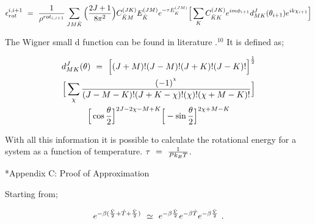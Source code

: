 \documentclass[11pt]{article}
\makeatletter
\let\workreportsection\section
\renewcommand{\section}{\@ifstar{\workreportstarsection}{\workreportsection}}
\newcommand{\workreportstarsection}[1]{\workreportsection*{#1}\addcontentsline{toc}{section}{#1}}
\makeatother
\begin{document}
\begin{equation}
\epsilon_{rot}^{i, i+1} \hspace{0.125cm} = \hspace{0.125cm}  \frac{1}{\rho^{rot_{i, i+1}}} \sum_{J M \hat{K}} \Big( \frac{2 J + 1}{8 \pi^2} \Big) C_{\hat{K} M}^{(JK)} E_{\hat{K}}^{(JM)} e^{- \tau E_{\hat{K}}^{(JM)}} \Big[ \sum_{K} C_{\hat{K} K}^{(JK)} e^{i m \phi_{i+1}} d_{MK}^{J} (\theta_{i+1} )  e^{i k \chi_{i+1}} \Big]
\end{equation}

The Wigner small d function can be found in literature \begin{math}.^{10} \end{math} It is defined as;

\begin{multline*}
d_{MK}^{J} ( \theta ) \hspace{0.125cm} = \hspace{0.125cm}  \Big[ (J + M)! (J - M)! (J + K)! (J - K)! \Big]^{\frac{1}{2}} \\ \Big[ \sum_{\chi} \frac{(-1)^{^{\chi}}}{(J - M - K)!(J + K - \chi)! (\chi)! (\chi + M - K)!} \Big] \\ \Big[ \cos{ \frac{\theta}{2}} \Big]^{2J - 2 \chi - M + K} \Big[ - \sin{ \frac{\theta}{2}} \Big]^{2\chi + M - K}
\end{multline*}

With all this information it is possible to calculate the rotational energy for a system as a function of temperature. \begin{math} \tau \hspace{0.125cm} = \hspace{0.125cm} \frac{1}{P k_B T} \end{math}.

\hypertarget{wr-appendix-c}{}
\section*{Appendix C: Proof of Approximation}
\label{wr-app-thrdappx-1}

Starting from;

\begin{equation} 
e^{-\beta ( \frac{\hat{V}}{2} + \hat{T} + \frac{\hat{V}}{2} )} \hspace{0.125cm} \simeq \hspace{0.125cm} e^{-\beta \frac{\hat{V}}{2}} e^{-\beta \hat{T}} e^{-\beta \frac{\hat{V}}{2}} \hspace{0.125cm} .
\end{equation}
\end{document}
